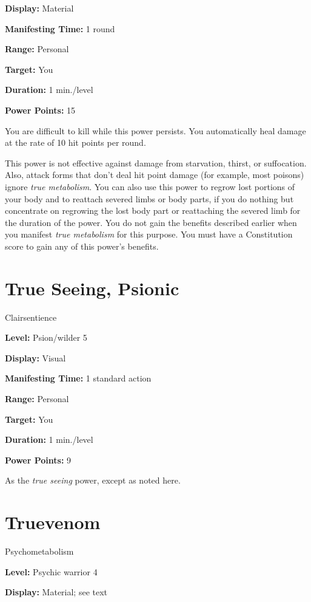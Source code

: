 \documentclass{article}
\begin{document}
\textbf{Display:} Material

\textbf{Manifesting Time:} 1 round

\textbf{Range:} Personal

\textbf{Target:} You

\textbf{Duration:} 1 min./level

\textbf{Power Points:} 15

You are difficult to kill while this power persists. You automatically heal damage 
at the rate of 10 hit points per round.

This power is not effective against damage from starvation, thirst, or suffocation. 
Also, attack forms that don't deal hit point damage (for example, most poisons) 
ignore \textit{true metabolism}. You can also use this power to regrow lost portions 
of your body and to reattach severed limbs or body parts, if you do nothing but 
concentrate on regrowing the lost body part or reattaching the severed limb for 
the duration of the power. You do not gain the benefits described earlier when 
you manifest \textit{true metabolism }for this purpose. You must have a Constitution 
score to gain any of this power's benefits.

\vspace{12pt}
\section*{True Seeing, Psionic}

Clairsentience

\textbf{Level:} Psion/wilder 5

\textbf{Display:} Visual

\textbf{Manifesting Time:} 1 standard action

\textbf{Range:} Personal

\textbf{Target:} You

\textbf{Duration:} 1 min./level

\textbf{Power Points:} 9

As the \textit{true seeing }power, except as noted here. 

\vspace{12pt}
\section*{Truevenom}

Psychometabolism

\textbf{Level:} Psychic warrior 4

\textbf{Display:} Material; see text
\end{document}
